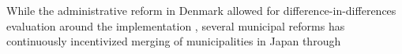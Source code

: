 \label{sec:empirics}
While the administrative reform in Denmark allowed for difference-in-differences evaluation around the implementation \citep{amore2013value}, several municipal reforms has continuously incentivized merging of municipalities in Japan through 
